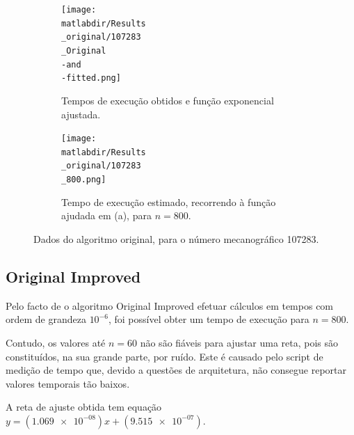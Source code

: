 \documentclass[portuguese,11pt,a4paper,titlepage]{article}
\newcommand{\matlabdir}{"../MATLAB-fittings"}
\begin{document}
\begin{figure}[h]
	\begin{subfigure}{0.47\textwidth}
	\texttt{[image: \\matlabdir/Results\\\_original/107283\\\_Original\\-and\\-fitted.png]} 
	\caption{Tempos de execução obtidos e função exponencial ajustada.}
	\label{fig:subim1}
	\end{subfigure}
	\hspace{0.049\textwidth}
	\begin{subfigure}{0.47\textwidth}
	\texttt{[image: \\matlabdir/Results\\\_original/107283\\\_800.png]}
	\caption{Tempo de execução estimado, recorrendo à função ajudada em (a), para \begin{math}n=800\end{math}.}
	\label{fig:original_800}
	\end{subfigure}
	
	\caption{Dados do algoritmo original, para o número mecanográfico 107283.}
	\label{fig:original107283}
\end{figure}

\subsection{Original Improved}
Pelo facto de o algoritmo Original Improved efetuar cálculos em tempos com ordem de grandeza
\begin{math}10^{-6}\end{math}, foi possível obter um tempo de execução para \begin{math}n = 800\end{math}.

Contudo, os valores até \begin{math}n = 60\end{math} não são fiáveis para ajustar uma reta,
pois são constituídos, na sua grande parte, por ruído.
Este é causado pelo script de medição de tempo que, devido a questões de arquitetura,
não consegue reportar valores temporais tão baixos.

A reta de ajuste obtida tem equação \begin{math}y=(\num{1.069e-08})x+(\num{9.515e-07})\end{math}.
\end{document}
